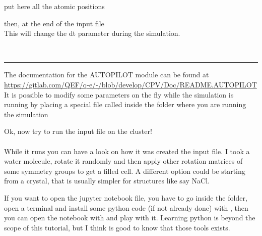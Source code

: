 \documentclass[landscape]{foils}
\begin{document}
\begin{minipage}{0.5\textwidth}
put here all the atomic positions\\
\end{minipage}
\begin{minipage}{0.5\textwidth}
then, at the end of the input file\\
This will change the dt parameter during the simulation.
\end{minipage}\\

\hrule The documentation for the AUTOPILOT module can be found at
\url{https://gitlab.com/QEF/q-e/-/blob/develop/CPV/Doc/README.AUTOPILOT}
It is possible to modify some parameters on the fly while the simulation is running by placing a special file called  inside the folder where you are running the simulation

Ok, now try to run the input file on the cluster!\\
\\
While it runs you can have a look on how it was created the input file. I took a water molecule, rotate it randomly and then apply other rotation matrices of some symmetry groups to get a filled cell. A different option could be starting from a crystal, that is usually simpler for structures like say NaCl.

If you want to open the jupyter notebook file, you have to go inside the  folder, open a terminal and install some python code (if not already done) with , then you can open the notebook with  and play with it. Learning python is beyond the scope of this tutorial, but I think is good to know that those tools exists.
\end{document}
